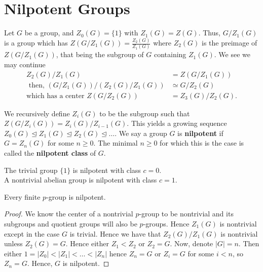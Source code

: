 \section{Nilpotent Groups}
Let \(G\) be a group, and \(Z_0 \left( G \right)  = \{1\} \) with \(Z_1 \left( G \right)  = Z\left( G \right) \). Thus, \( G / Z_1\left( G \right) \) is a group which has \(Z\left( G / Z_1\left( G \right)  \right)  = \frac{Z_2 \left( G \right) }{Z_1 \left( G \right) }\) where \(Z_2\left( G \right) \) is the preimage of \( Z(G  / Z_1\left( G \right)) \), that being the subgroup of \(G\) containing \(Z_1 \left( G \right) \). We see we may continue
\begin{align*}
	Z_2 \left( G \right) / Z_1\left( G \right)  &=  Z\left( G / Z_1 \left( G \right)  \right)  \\
	\text{ then, } \left( G / Z_1\left( G \right)  \right)  / \left( Z_2 \left( G \right)  / Z_1 \left( G \right) \right) &\simeq G / Z_2\left( G \right)\\
	\text{which has a center } Z\left( G / Z_2\left( G \right)  \right) &=  Z_3 \left( G \right) / Z_2\left( G \right)
.\end{align*}
\begin{definition}[Nilpotence]
	We recursively define \(Z_{i} \left( G \right) \) to be the subgroup such that \(Z\left( G / Z_i \left( G \right)  \right) = Z_{i}\left( G \right)  / Z_{i-1} \left( G \right)  \). This yields a growing sequence \(Z_0 \left( G \right)  \trianglelefteq Z_1 \left( G \right)  \trianglelefteq Z_2\left( G \right)  \trianglelefteq \ldots\). We say a group \(G\) is \textbf{nilpotent} if \(G = Z_{n} \left( G \right) \) for some \(n\ge 0\). The minimal \(n\ge 0\) for which this is the case is called the \textbf{nilpotent class} of \(G\).
\end{definition}
\begin{example}
	The trivial group \(\{1\} \) is nilpotent with class \(c = 0\).\\
	A nontrivial abelian group is nilpotent with class \(c=1\).\\
\end{example}
\begin{theorem}
	Every finite \(p\)-group is nilpotent.
\end{theorem}
\begin{proof}
	We know the center of a nontrivial \(p\)-group to be nontrivial and its subgroups and quotient groups will also be \(p\)-groups. Hence \(Z_1\left( G \right) \) is nontrivial except in the case \(G\) is trivial. Hence we have that \(Z_2\left( G \right)  / Z_1\left( G \right) \) is nontrivial unless \(Z_2 \left( G \right)  = G\). Hence either \(Z_1 < Z_2\) or \(Z_2 = G\). Now, denote \(\left| G \right|  = n\). Then either \(1 = \left| Z_0 \right|  < \left| Z_1 \right|  < \ldots < \left| Z_{n} \right| \) hence \(Z_{n} = G\) or \(Z_{i} = G\) for some \(i < n\), so \(Z_{n} = G\). Hence, \(G\) is nilpotent.
\end{proof}
